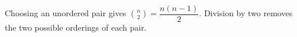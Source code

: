 Choosing an unordered pair gives $\boxed{\binom n2=\dfrac{n(n-1)}{2}}$. Division by two removes the two possible orderings of each pair.
